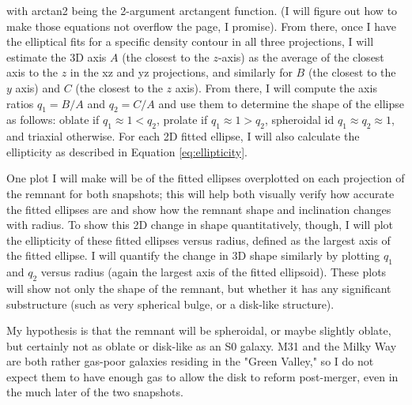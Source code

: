 \documentclass[twocolumn]{aastex631}
\begin{document}
with arctan2 being the 2-argument arctangent function. (I will figure out how to make those equations not overflow the page, I promise).
From there, once I have the elliptical fits for a specific density contour in all three projections, I will estimate the 3D axis $A$ (the closest to the $z$-axis) as the average of the closest axis to the $z$ in the xz and yz projections, and similarly for $B$ (the closest to the $y$ axis) and $C$ (the closest to the $z$ axis).
From there, I will compute the axis ratios $q_1 = B/A$ and $q_2 = C/A$ and use them to determine the shape of the ellipse as follows: oblate if $q_1 \approx 1 < q_2$, prolate if $q_1 \approx 1 > q_2$, spheroidal id $q_1 \approx q_2 \approx 1$, and triaxial otherwise.
For each 2D fitted ellipse, I will also calculate the ellipticity as described in Equation \ref{eq:ellipticity}.

One plot I will make will be of the fitted ellipses overplotted on each projection of the remnant for both snapshots; this will help both visually verify how accurate the fitted ellipses are and show how the remnant shape and inclination changes with radius. 
To show this 2D change in shape quantitatively, though, I will plot the ellipticity of these fitted ellipses versus radius, defined as the largest axis of the fitted ellipse.
I will quantify the change in 3D shape similarly by plotting $q_1$ and $q_2$ versus radius (again the largest axis of the fitted ellipsoid).
These plots will show not only the shape of the remnant, but whether it has any significant substructure (such as very spherical bulge, or a disk-like structure). 

My hypothesis is that the remnant will be spheroidal, or maybe slightly oblate, but certainly not as oblate or disk-like as an S0 galaxy. 
M31 and the Milky Way are both rather gas-poor galaxies residing in the "Green Valley," so I do not expect them to have enough gas to allow the disk to reform post-merger, even in the much later of the two snapshots.



{}

\end{document}
